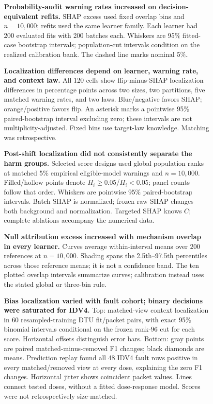 \documentclass[10pt]{article}
\begin{document}
\begin{figure}[!ht]
\centering

\caption{\textbf{Probability-audit warning rates increased on decision-equivalent refits.} SHAP excess used fixed overlap bins and $n=10{,}000$; refits used the same learner family. Each learner had 200 evaluated fits with 200 batches each. Whiskers are 95\% fitted-case bootstrap intervals; population-cut intervals condition on the realized calibration bank. The dashed line marks nominal 5\%.}
\end{figure}
\clearpage
\begin{figure}[!ht]
\centering

\caption{\textbf{Localization differences depend on learner, warning rate, and context law.} All 120 cells show flip-minus-SHAP localization differences in percentage points across two sizes, two partitions, five matched warning rates, and two laws. Blue/negative favors SHAP; orange/positive favors flip. An asterisk marks a pointwise 95\% paired-bootstrap interval excluding zero; these intervals are not multiplicity-adjusted. Fixed bins use target-law knowledge. Matching was retrospective.}
\end{figure}
\clearpage
\begin{figure}[!ht]
\centering

\caption{\textbf{Post-shift localization did not consistently separate the harm groups.} Selected score designs used global population ranks at matched 5\% empirical eligible-model warnings and $n=10{,}000$. Filled/hollow points denote $H_i\geq0.05$/$H_i<0.05$; panel counts follow that order. Whiskers are pointwise 95\% paired-bootstrap intervals. Batch SHAP is normalized; frozen raw SHAP changes both background and normalization. Targeted SHAP knows $C$; complete ablations accompany the numerical data.}
\end{figure}
\clearpage
\begin{figure}[!ht]
\centering

\caption{\textbf{Null attribution excess increased with mechanism overlap in every learner.} Curves average within-interval means over 200 references at $n=10{,}000$. Shading spans the 2.5th--97.5th percentiles across those reference means; it is not a confidence band. The ten plotted overlap intervals summarize curves; calibration instead uses the stated global or three-bin rule.}
\end{figure}
\clearpage
\begin{figure}[!ht]
\centering

\caption{\textbf{Bias localization varied with fault cohort; binary decisions were saturated for IDV4.} Top: matched-view context localization in 60 resampled-training DTU fit/packet pairs, with exact 95\% binomial intervals conditional on the frozen rank-96 cut for each score. Horizontal offsets distinguish error bars. Bottom: gray points are paired matched-minus-removed F1 changes; black diamonds are means. Prediction replay found all 48 IDV4 fault rows positive in every matched/removed view at every dose, explaining the zero F1 changes. Horizontal jitter shows coincident packet values. Lines connect tested doses, without a fitted dose-response model. Scores were not retrospectively size-matched.}
\end{figure}
\end{document}

